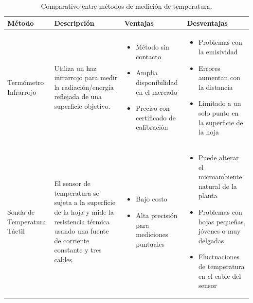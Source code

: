 \FloatBarrier
\begin{table}[h!]
    \centering
    \caption{Comparativo entre métodos de medición de temperatura.}
    \label{tab:comparativo_metodos}
    \renewcommand{\arraystretch}{1.1}
    \small
    \begin{tabular}{@{}p{2.5cm} p{4.5cm} p{4.0cm} p{4.0cm}@{}}
        \toprule
        \textbf{Método} & \textbf{Descripción} & \textbf{Ventajas} & \textbf{Desventajas} \\
        \midrule
        Termómetro Infrarrojo & Utiliza un haz infrarrojo para medir la radiación/energía reflejada de una superficie objetivo. & 
        \begin{itemize}[topsep=0pt, itemsep=0pt, partopsep=0pt, parsep=0pt, leftmargin=1.2em]
            \item Método sin contacto
            \item Amplia disponibilidad en el mercado
            \item Preciso con certificado de calibración
        \end{itemize} & 
        \begin{itemize}[topsep=0pt, itemsep=0pt, partopsep=0pt, parsep=0pt, leftmargin=1.2em]
            \item Problemas con la emisividad
            \item Errores aumentan con la distancia
            \item Limitado a un solo punto en la superficie de la hoja
        \end{itemize} \\
        
        Sonda de Temperatura Táctil & El sensor de temperatura se sujeta a la superficie de la hoja y mide la resistencia térmica usando una fuente de corriente constante y tres cables. &
        \begin{itemize}[topsep=0pt, itemsep=0pt, partopsep=0pt, parsep=0pt, leftmargin=1.2em]
            \item Bajo costo
            \item Alta precisión para mediciones puntuales
        \end{itemize} &
        \begin{itemize}[topsep=0pt, itemsep=0pt, partopsep=0pt, parsep=0pt, leftmargin=1.2em]
            \item Puede alterar el microambiente natural de la planta
            \item Problemas con hojas pequeñas, jóvenes o muy delgadas
            \item Fluctuaciones de temperatura en el cable del sensor
        \end{itemize} \\
        

\end{tabular}
\end{table}
